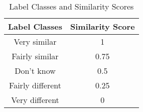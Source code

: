 

\begin{table}[th]
\centering
\caption{Label Classes and Similarity Scores}
\label{tab:manualLabels}
\small{
\begin{tabular}{|c|c|}\hline
Label Classes	& Similarity Score\\\hline\hline
Very similar 	&1\\
Fairly similar	&0.75\\
Don't know	&0.5\\
Fairly different	&0.25\\
Very different	&0\\\hline
\end{tabular}
}
\end{table}

